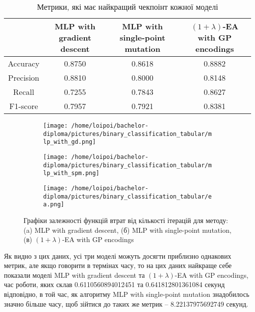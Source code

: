 \begin{table}[ht]
	\caption{Метрики, які має найкращий чекпоінт кожної моделі}
	\label{metrics_bc_td_results}
	\centering
	\begin{adjustbox}{max width=\textwidth}
		\begin{tabular}{|c|c|c|c|}
			\hline 
			 & MLP with gradient descent & MLP with single-point mutation & $(1+\lambda)$-EA with GP encodings \\
			\hline 
			Accuracy & 0.8750 & 0.8618 & 0.8882 \\
			\hline 
			Precision & 0.8810 & 0.8000 & 0.8148 \\
			\hline
			Recall & 0.7255 & 0.7843 & 0.8627 \\
			\hline
			F1-score & 0.7957 & 0.7921 & 0.8381 \\
			\hline
		\end{tabular}
	\end{adjustbox}
\end{table}

\begin{figure}[ht]
	\centering
	\begin{subfigure}[b]{0.85\textwidth}    
		\texttt{[image: /home/loipoi/bachelor-diploma/pictures/binary\_classification\_tabular/mlp\_with\_gd.png]}
		\caption{}
	\end{subfigure}%

	\begin{subfigure}[b]{0.85\textwidth}
		\texttt{[image: /home/loipoi/bachelor-diploma/pictures/binary\_classification\_tabular/mlp\_with\_spm.png]}
		\caption{}
	\end{subfigure}%
	
	\begin{subfigure}[b]{0.85\textwidth}
		\texttt{[image: /home/loipoi/bachelor-diploma/pictures/binary\_classification\_tabular/ea.png]}
		\caption{}
	\end{subfigure}
	
	\caption{Графіки залежності функцій втрат від кількості ітерацій для методу: (a) MLP with gradient descent, (б) MLP with single-point mutation, (в) $(1+\lambda)$-EA with GP encodings}
	\label{fig_losses}
\end{figure}

Як видно з цих даних, усі три моделі можуть досягти приблизно однакових метрик, але якщо говорити в термінах часу, то на цих даних найкраще себе показали моделі MLP with gradient descent та $(1+\lambda)$-EA with GP encodings, час роботи, яких склав 0.6110560894012451 та 0.641812801361084 секунд відповідно, в той час, як алгоритму MLP with single-point mutation знадобилось значно більше часу, щоб зійтися до таких же метрик -- 8.22137975692749 секунд.

